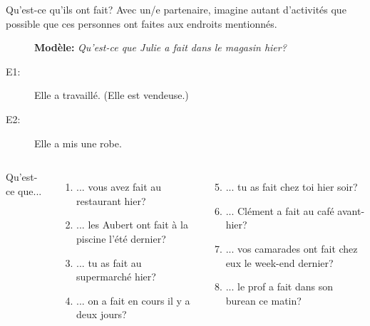 \begin{frame}{Qu'est-ce qu'ils ont fait?}
  Avec un/e partenaire, imagine autant d'activités que possible que ces personnes ont faites aux endroits mentionnés. \\
  \begin{description}
    \item[] \textbf{Modèle:} \emph{Qu'est-ce que Julie a fait dans le magasin hier?}
    \item[E1:] Elle a travaillé. (Elle est vendeuse.)
    \item[E2:] Elle a mis une robe.
  \end{description}
  \begin{columns}[t]
      Qu'est-ce que...
      \begin{enumerate}
        \item ... vous avez fait au restaurant hier?
        \item ... les Aubert ont fait à la piscine l'été dernier?
        \item ... tu as fait au supermarché hier?
        \item ... on a fait en cours il y a deux jours?
      \end{enumerate}
      \begin{enumerate}
        \setcounter{enumi}{4}
        \item ... tu as fait chez toi hier soir?
        \item ... Clément a fait au café avant-hier?
        \item ... vos camarades ont fait chez eux le week-end dernier?
        \item ... le prof a fait dans son burean ce matin?
      \end{enumerate}
  \end{columns}
\end{frame}